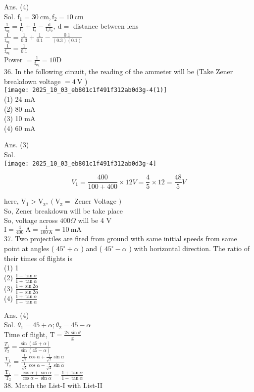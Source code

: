 \documentclass[10pt]{article}
\begin{document}
Ans. (4)\\
Sol. \(\mathrm{f}_{1}=30 \mathrm{~cm}, \mathrm{f}_{2}=10 \mathrm{~cm}\)\\
\(\frac{1}{\mathrm{f}_{\mathrm{eq}}}=\frac{1}{\mathrm{f}_{1}}+\frac{1}{\mathrm{f}_{2}}-\frac{\mathrm{d}}{\mathrm{f}_{1} \mathrm{f}_{2}}, \mathrm{~d}=\) distance between lens\\
\(\frac{1}{\mathrm{f}_{\text {eq }}}=\frac{1}{0.3}+\frac{1}{0.1}-\frac{0.1}{(0.3)(0.1)}\)\\
\(\frac{1}{\mathrm{f}_{\text {eq }}}=\frac{1}{0.1}\)\\
Power \(=\frac{1}{\mathrm{f}_{\mathrm{eq}}}=10 \mathrm{D}\)\\
36. In the following circuit, the reading of the ammeter will be (Take Zener breakdown voltage \(=4 \mathrm{~V}\) )\\
\texttt{[image: 2025\_10\_03\_eb801c1f491f312ab0d3g-4(1)]}\\
(1) 24 mA\\
(2) 80 mA\\
(3) 10 mA\\
(4) 60 mA

Ans. (3)\\
Sol.\\
\texttt{[image: 2025\_10\_03\_eb801c1f491f312ab0d3g-4]}

\[
V_{1}=\frac{400}{100+400} \times 12 V=\frac{4}{5} \times 12=\frac{48}{5} V
\]

here, \(\mathrm{V}_{1}>\mathrm{V}_{\mathrm{z}},\left(\mathrm{V}_{\mathrm{z}}=\right.\) Zener Voltage \()\)\\
So, Zener breakdown will be take place\\
So, voltage across \(400 \Omega\) will be 4 V\\
\(\mathrm{I}=\frac{4}{400} \mathrm{~A}=\frac{1}{100 \mathrm{~A}}=10 \mathrm{~mA}\)\\
37. Two projectiles are fired from ground with same initial speeds from same point at angles ( \(45^{\circ}+\alpha\) ) and ( \(45^{\circ}-\alpha\) ) with horizontal direction. The ratio of their times of flights is\\
(1) 1\\
(2) \(\frac{1-\tan \alpha}{1+\tan \alpha}\)\\
(3) \(\frac{1+\sin 2 \alpha}{1-\sin 2 \alpha}\)\\
(4) \(\frac{1+\tan \alpha}{1-\tan \alpha}\)

Ans. (4)\\
Sol. \(\theta_{1}=45+\alpha ; \theta_{2}=45-\alpha\)\\
Time of flight, \(\mathrm{T}=\frac{2 \mathrm{v} \sin \theta}{\mathrm{g}}\)\\
\(\frac{T_{1}}{T_{2}}=\frac{\sin (45+\alpha)}{\sin (45-\alpha)}\)\\
\(\frac{\mathrm{T}_{1}}{\mathrm{~T}_{2}}=\frac{\frac{1}{\sqrt{2}} \cos \alpha+\frac{1}{\sqrt{2}} \sin \alpha}{\frac{1}{\sqrt{2}} \cos \alpha-\frac{1}{\sqrt{2}} \sin \alpha}\)\\
\(\frac{\mathrm{T}_{1}}{\mathrm{~T}_{2}}=\frac{\cos \alpha+\sin \alpha}{\cos \alpha-\sin \alpha}=\frac{1+\tan \alpha}{1-\tan \alpha}\)\\
38. Match the List-I with List-II
\end{document}
